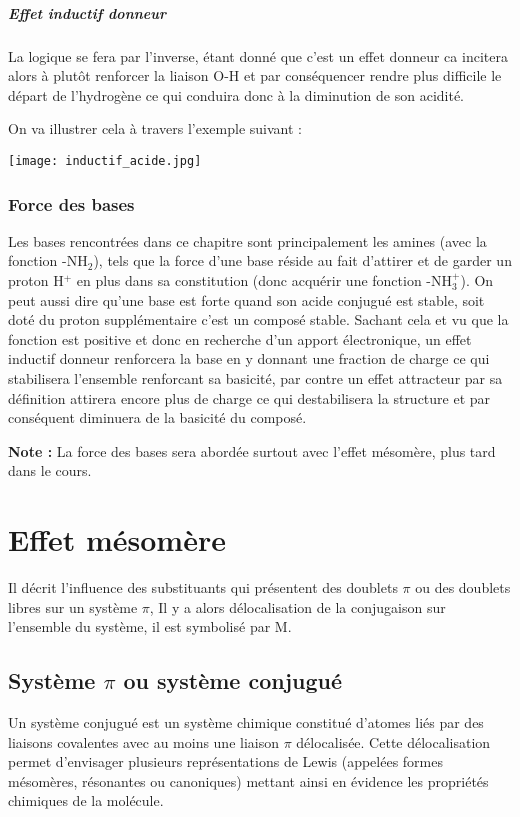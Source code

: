 \documentclass[a4paper, oneside]{book}
\begin{document}
\paragraph{Effet inductif donneur}
La logique se fera par l'inverse, étant donné que c'est un effet donneur ca incitera alors à plutôt renforcer la liaison O-H et par conséquencer rendre plus difficile le départ de l'hydrogène ce qui conduira donc à la diminution de son acidité.

On va illustrer cela à travers l'exemple suivant :
\begin{center}
    \texttt{[image: inductif\_acide.jpg]}
\end{center}
\subsection{Force des bases}
Les bases rencontrées dans ce chapitre sont principalement les amines (avec la fonction -NH$_2$), tels que la force d'une base réside au fait d'attirer et de garder un proton H$^+$ en plus dans sa constitution (donc acquérir une fonction -NH$_3^+$). On peut aussi dire qu'une base est forte quand son acide conjugué est stable, soit doté du proton supplémentaire c'est un composé stable. Sachant cela et vu que la fonction est positive et donc en recherche d'un apport électronique, un effet inductif donneur renforcera la base en y donnant une fraction de charge ce qui stabilisera l'ensemble renforcant sa basicité, par contre un effet attracteur par sa définition attirera encore plus de charge ce qui destabilisera la structure et par conséquent diminuera de la basicité du composé.

\textbf{Note :} La force des bases sera abordée surtout avec l'effet mésomère, plus tard dans le cours.
\chapter{Effet mésomère}
\minitoc
Il décrit l'influence des substituants qui présentent des doublets $\pi$ ou des doublets libres sur un système $\pi$, Il y a alors délocalisation de la conjugaison sur l'ensemble du système, il est symbolisé par M.
\section{Système $\pi$ ou système conjugué}
Un système conjugué est un système chimique constitué d'atomes liés par des liaisons covalentes avec au moins une liaison $\pi$ délocalisée. Cette délocalisation permet d'envisager plusieurs représentations de Lewis (appelées formes mésomères, résonantes ou canoniques) mettant ainsi en évidence les propriétés chimiques de la molécule.
\end{document}
